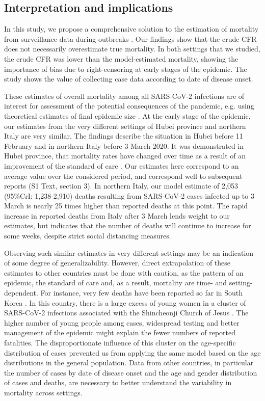 \documentclass{article}
\begin{document}
\subsection*{Interpretation and implications} 

In this study, we propose a comprehensive solution to the estimation of mortality from surveillance data during outbreaks \cite{Lipsitch2015}. Our findings show that the crude CFR does not necessarily overestimate true mortality. 
In both settings that we studied, the crude CFR was lower than the model-estimated mortality, showing the importance of bias due to right-censoring at early stages of the epidemic. 
The study shows the value of collecting case data according to date of disease onset.

These estimates of overall mortality among all SARS-CoV-2 infections are of interest for assessment of the potential consequences of the pandemic, e.g. using theoretical estimates of final epidemic size \cite{hethcote2000mathematics}. 
At the early stage of the epidemic, our estimates from the very different settings of Hubei province and northern Italy are very similar. 
The findings describe the situation in Hubei before 11 February and in northern Italy before 3 March 2020. 
It was demonstrated in Hubei province, that mortality rates have changed over time as a result of an improvement of the standard of care \cite{jointmission}. 
Our estimates here correspond to an average value over the considered period, and correspond well to subsequent reports (S1 Text, section 3).
In northern Italy, our model estimate of 2,053 (95\%CrI: 1,238-2,910) deaths resulting from SARS-CoV-2 cases infected up to 3 March is nearly  25 times higher than reported deaths at this point. 
The rapid increase in reported deaths from Italy after 3 March lends weight to our estimates, but indicates that the number of deaths will continue to increase for some weeks, despite strict social distancing measures.

Observing such similar estimates in very different settings may be an indication of some degree of generalizability. 
However, direct extrapolation of these estimates to other countries must be done with caution, as the pattern of an epidemic, the standard of care and, as a result, mortality are time- and setting-dependent. 
For instance, very few deaths have been reported so far in South Korea \cite{KCDC}. 
In this country, there is a large excess of young women in a cluster of SARS-CoV-2 infections associated with the Shincheonji Church of Jesus \cite{shim2020transmission}. 
The higher number of young people among cases, widespread testing and better management of the epidemic might explain the fewer numbers of reported fatalities. 
The disproportionate influence of this cluster on the age-specific distribution of cases prevented us from applying the same model based on the age distributions in the general population. 
Data from other countries, in particular the number of cases by date of disease onset and the age and gender distribution of cases and deaths, are necessary to better understand the variability in mortality across settings. 
\end{document}
